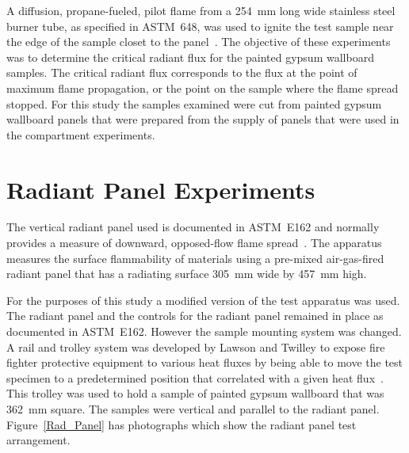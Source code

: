 \documentclass[twoside]{uocthesis}
\begin{document}
A diffusion, propane-fueled, pilot flame from a 254~mm long wide stainless steel burner tube, as specified in ASTM~648, was used to ignite the test sample near the edge of the sample closet to the panel~\cite{ASTM_E648}. The objective of these experiments was to determine the critical radiant flux for the painted gypsum wallboard samples.  The critical radiant flux corresponds to the flux at the point of maximum flame propagation, or the point on the sample where the flame spread stopped. For this study the samples examined were cut from painted gypsum wallboard panels that were prepared from the supply of panels that were used in the compartment experiments.  



\section{Radiant Panel Experiments}

The vertical radiant panel used is documented in ASTM~E162 and normally provides a measure of downward, opposed-flow flame spread~\cite{ASTM_E162}.  The apparatus measures the surface flammability of materials using a pre-mixed air-gas-fired radiant panel that has a radiating surface 305~mm wide by 457~mm high.

For the purposes of this study a modified version of the test apparatus was used.  The radiant panel and the controls for the radiant panel  remained in place as documented in ASTM~E162. However the sample mounting system was changed. A rail and trolley system was developed by Lawson and Twilley to expose fire fighter protective equipment to various heat fluxes by being able to move the test specimen to a predetermined position that correlated with a given heat flux~\cite{Lawson:1999}.  This trolley was used to hold a sample of painted gypsum wallboard that was 362~mm square.  The samples were vertical and parallel to the radiant panel. Figure~\ref{Rad_Panel} has photographs which show the radiant panel test arrangement.
\end{document}
